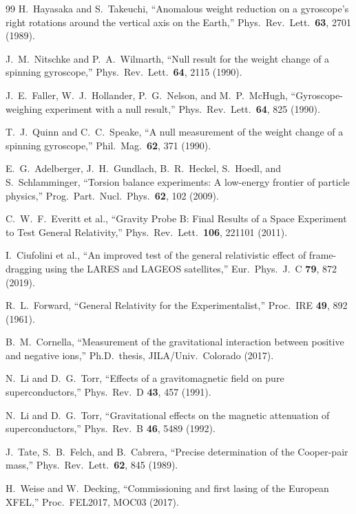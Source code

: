 \documentclass[aps,prd,twocolumn,superscriptaddress,floatfix,nofootinbib]{revtex4-2}
\begin{document}
\begin{thebibliography}{99}
H.~Hayasaka and S.~Takeuchi, ``Anomalous weight reduction on a
gyroscope's right rotations around the vertical axis on the Earth,''
Phys.\ Rev.\ Lett.\ \textbf{63}, 2701 (1989).

J.~M.~Nitschke and P.~A.~Wilmarth, ``Null result for the weight
change of a spinning gyroscope,'' Phys.\ Rev.\ Lett.\ \textbf{64},
2115 (1990).

J.~E.~Faller, W.~J.~Hollander, P.~G.~Nelson, and M.~P.~McHugh,
``Gyroscope-weighing experiment with a null result,'' Phys.\ Rev.\
Lett.\ \textbf{64}, 825 (1990).

T.~J.~Quinn and C.~C.~Speake, ``A null measurement of the weight
change of a spinning gyroscope,'' Phil.\ Mag.\ \textbf{62}, 371
(1990).

E.~G.~Adelberger, J.~H.~Gundlach, B.~R.~Heckel, S.~Hoedl, and
S.~Schlamminger, ``Torsion balance experiments: A low-energy frontier
of particle physics,'' Prog.\ Part.\ Nucl.\ Phys.\ \textbf{62},
102 (2009).

C.~W.~F.~Everitt et al., ``Gravity Probe B: Final Results of a Space
Experiment to Test General Relativity,'' Phys.\ Rev.\ Lett.\
\textbf{106}, 221101 (2011).

I.~Ciufolini et al., ``An improved test of the general relativistic
effect of frame-dragging using the LARES and LAGEOS satellites,''
Eur.\ Phys.\ J.\ C \textbf{79}, 872 (2019).

R.~L.~Forward, ``General Relativity for the Experimentalist,''
Proc.\ IRE \textbf{49}, 892 (1961).

B.~M.~Cornella, ``Measurement of the gravitational interaction
between positive and negative ions,'' Ph.D.\ thesis, JILA/Univ.\
Colorado (2017).

\bibitem{Li1991}
N.~Li and D.~G.~Torr, ``Effects of a gravitomagnetic field on pure
superconductors,'' Phys.\ Rev.\ D \textbf{43}, 457 (1991).

\bibitem{Li1993}
N.~Li and D.~G.~Torr, ``Gravitational effects on the magnetic
attenuation of superconductors,'' Phys.\ Rev.\ B \textbf{46},
5489 (1992).

\bibitem{Tate2006}
J.~Tate, S.~B.~Felch, and B.~Cabrera, ``Precise determination of
the Cooper-pair mass,'' Phys.\ Rev.\ Lett.\ \textbf{62}, 845
(1989).

\bibitem{Weise2017}
H.~Weise and W.~Decking, ``Commissioning and first lasing of the
European XFEL,'' Proc.\ FEL2017, MOC03 (2017).


\end{thebibliography}
\end{document}
